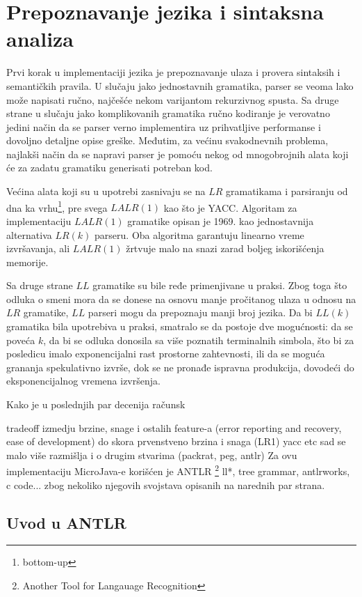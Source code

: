 \chapter{Prepoznavanje jezika i sintaksna analiza}

Prvi korak u implementaciji jezika je prepoznavanje ulaza i provera sintaksih i semantičkih pravila. 
U slučaju jako jednostavnih gramatika, parser se veoma lako može napisati ručno, najčešće nekom varijantom rekurzivnog spusta. 
Sa druge strane u slučaju jako komplikovanih gramatika ručno kodiranje je verovatno jedini način da se parser verno implementira uz prihvatljive performanse i dovoljno detaljne opise greške.
Međutim, za većinu svakodnevnih problema, najlakši način da se napravi parser je pomoću nekog od mnogobrojnih alata koji će za zadatu gramatiku generisati potreban kod. 

Većina alata koji su u upotrebi zasnivaju se na $LR$ gramatikama i parsiranju od dna ka vrhu\footnote{\eng bottom-up}, pre svega $LALR(1)$ kao što je YACC.
Algoritam za implementaciju $LALR(1)$ gramatike opisan je 1969. kao jednostavnija alternativa $LR(k)$ parseru.
Oba algoritma garantuju linearno vreme izvršavanja, ali $LALR(1)$ žrtvuje malo na snazi zarad boljeg iskorišćenja memorije.

Sa druge strane $LL$ gramatike su bile ređe primenjivane u praksi.
Zbog toga što odluka o smeni mora da se donese na osnovu manje pročitanog ulaza u odnosu na $LR$ gramatike, $LL$ parseri mogu da prepoznaju manji broj jezika.
Da bi $LL(k)$ gramatika bila upotrebiva u praksi, smatralo se da postoje dve mogućnosti: da se poveća $k$, da bi se odluka donosila sa više poznatih terminalnih simbola, što bi za posledicu imalo exponencijalni rast prostorne zahtevnosti, ili da se moguća grananja spekulativno izvrše, dok se ne pronađe ispravna produkcija, dovodeći do eksponencijalnog vremena izvršenja.

Kako je u poslednjih par decenija računsk

tradeoff izmedju brzine, snage i ostalih feature-a (error reporting and recovery, ease of development)
do skora prvenstveno brzina i snaga (LR1) yacc etc
sad se malo više razmišlja i o drugim stvarima (packrat, peg, antlr)
Za ovu implementaciju MicroJava-e korišćen je ANTLR
\footnote{\skr \eng Another Tool for Langauage Recognition} 
ll*, tree grammar, antlrworks, c code...
zbog nekoliko njegovih svojstava opisanih na narednih par strana.

\section{Uvod u ANTLR}

